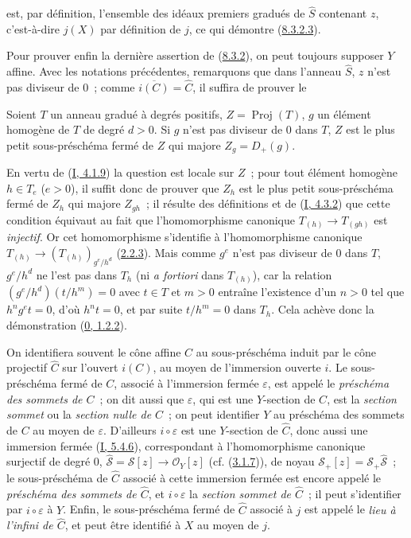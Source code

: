 est, par définition, l'ensemble des idéaux premiers gradués de $\widehat{S}$
contenant $z$, c'est-à-dire $j(X)$ par définition de $j$, ce qui démontre
(\hyperref[II.8.3.2.3-fr]{8.3.2.3}).

Pour prouver enfin la dernière assertion de
(\hyperref[II.8.3.2-fr]{8.3.2}), on peut toujours supposer $Y$ affine. Avec
les notations précédentes, remarquons que dans l'anneau $\widehat{S}$, $z$
n'est pas diviseur de $0$~; comme $\overline{i(C)}=\widehat{C}$, il suffira
de prouver le

\begin{lemma}[8.3.2.7]
\label{II.8.3.2.7-fr}
Soient $T$ un anneau gradué à degrés positifs,
$Z=\operatorname{Proj}(T)$, $g$ un élément homogène de $T$ de degré $d>0$.
Si $g$ n'est pas diviseur de $0$ dans $T$, $Z$ est le plus petit
sous-préschéma fermé de $Z$ qui majore $Z_g=D_+(g)$.
\end{lemma}

En vertu de (\hyperref[I.4.1.9-fr]{I, 4.1.9}) la question est locale sur $Z$~;
pour tout élément homogène $h\in T_e$ ($e>0$), il suffit donc de prouver que
$Z_h$ est le plus petit sous-préschéma fermé de $Z_h$ qui majore $Z_{gh}$~;
il résulte des définitions et de (\hyperref[I.4.3.2-fr]{I, 4.3.2}) que cette
condition équivaut au fait que l'homomorphisme canonique
$T_{(h)}\to T_{(gh)}$ est \emph{injectif}. Or cet homomorphisme s'identifie à
l'homomorphisme canonique
$T_{(h)}\to(T_{(h)})_{g^e/h^d}$ (\hyperref[II.2.2.3-fr]{2.2.3}). Mais comme
$g^e$ n'est pas diviseur de $0$ dans $T$, $g^e/h^d$ ne l'est pas dans $T_h$
(ni \emph{a fortiori} dans $T_{(h)}$), car la relation
$(g^e/h^d)(t/h^m)=0$ avec $t\in T$ et $m>0$ entraîne l'existence d'un $n>0$
tel que $h^ng^et=0$, d'où $h^nt=0$, et par suite $t/h^m=0$ dans $T_h$. Cela
achève donc la démonstration (\hyperref[0.1.2.2-fr]{0, 1.2.2}).

\begin{env}[8.3.3]
\label{II.8.3.3-fr}
On identifiera souvent le cône affine $C$ au sous-préschéma induit par le cône
projectif $\widehat{C}$ sur l'ouvert $i(C)$, au moyen de l'immersion ouverte
$i$. Le sous-préschéma fermé de $C$, associé à l'immersion fermée
$\varepsilon$, est appelé le \emph{préschéma des sommets de $C$}~; on dit
aussi que $\varepsilon$, qui est une $Y$-section de $C$, est la \emph{section
sommet} ou la \emph{section nulle de $C$}~; on peut identifier $Y$ au
préschéma des sommets de $C$ au moyen de $\varepsilon$. D'ailleurs
$i\circ\varepsilon$ est une $Y$-section de $\widehat{C}$, donc aussi une
immersion fermée (\hyperref[I.5.4.6-fr]{I, 5.4.6}), correspondant à
l'homomorphisme canonique surjectif de degré $0$,
$\widehat{\mathcal{S}}=\mathcal{S}[z]\to\mathcal{O}_Y[z]$
(cf. (\hyperref[II.3.1.7-fr]{3.1.7})), de noyau
$\mathcal{S}_+[z]=\mathcal{S}_+\widehat{\mathcal{S}}$~; le sous-préschéma de
$\widehat{C}$ associé à cette immersion fermée est encore appelé le
\emph{préschéma des sommets de $\widehat{C}$}, et $i\circ\varepsilon$ la
\emph{section sommet de $\widehat{C}$}~; il peut s'identifier par
$i\circ\varepsilon$ à $Y$. Enfin, le sous-préschéma fermé de $\widehat{C}$
associé à $j$ est appelé le \emph{lieu à l'infini de $\widehat{C}$}, et peut
être identifié à $X$ au moyen de $j$.
\end{env}

